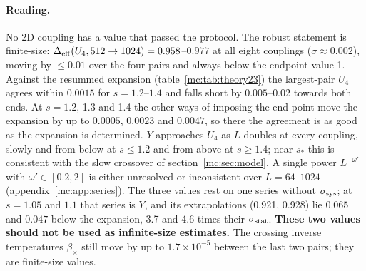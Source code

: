 \paragraph{Reading.} No 2D coupling has a value that passed the protocol. The robust statement is finite-size: $\Delta_{\rm eff}(U_4,512\to1024)=0.958$--$0.977$
at all eight couplings ($\sigma\approx0.002$), moving by $\le0.01$ over the four pairs and always below the endpoint value 1. Against the
resummed expansion (table~\ref{mc:tab:theory23}) the largest-pair $U_4$ agrees within $0.0015$ for $s=1.2$--$1.4$ and falls short by $0.005$--$0.02$
towards both ends. At $s=1.2$, 1.3 and 1.4 the other ways of imposing the end point move the expansion by up to $0.0005$, $0.0023$ and $0.0047$,
so there the agreement is as good as the expansion is determined. $Y$ approaches $U_4$ as $L$ doubles at every coupling, slowly and from below at $s\le1.2$ and from above at $s\ge1.4$; near $s_*$ this is
consistent with the slow crossover of section~\ref{mc:sec:model}. A single power $L^{-\omega'}$ with $\omega'\in[0.2,2]$ is either unresolved or inconsistent over $L=64$--$1024$
(appendix~\ref{mc:app:series}). The three  values rest on one series without $\sigma_{\rm sys}$; at $s=1.05$ and $1.1$ that series is $Y$, and
its extrapolations (0.921, 0.928) lie $0.065$ and $0.047$ below the expansion, 3.7 and 4.6 times their $\sigma_{\rm stat}$. \textbf{These two values should
not be used as infinite-size estimates.} The crossing inverse temperatures $\beta_\times$ still move by up to $1.7\times10^{-5}$ between the last two
pairs; they are finite-size values.

